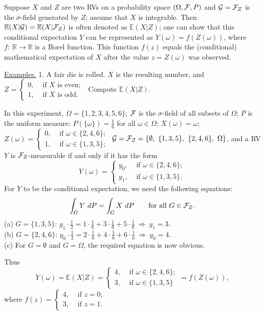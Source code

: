 \documentclass[a4paper,10pt]{article}
\def\RR{\mathbb{R}}
\def\EE{\mathbb{E}}
\newcommand{\1}[1]{\mathbf{1}_{\{#1\}}}
\begin{document}
Suppose $X$ and $Z$ are two RVs on a probability space $(\Omega,{\cal F},P)$ and ${\cal G}={\cal F}_Z$ is the $\sigma$-field generated by $Z$; assume that $X$ is integrable. Then $\EE(X|{\cal G})=\EE(X|{\cal F}_Z)$ is often denoted as $\EE(X|Z)$; one can show that this conditional expectation $Y$ can be represented as $Y(\omega)=f(Z(\omega))$, where $f:~\RR\to\RR$ is a Borel function. This function $f(z)$ equals the (conditional) mathematical expectation of $X$ after the value $z=Z(\omega)$ was observed.\vspace{3mm}

\underline{Examples.} 1. A fair die is rolled. $X$ is the resulting number, and $Z=\left\{\begin{array}{ll} 0, & \mbox{ if } X \mbox{ is even; } \\ 1, & \mbox{ if } X \mbox{ is odd.} \end{array}\right. $ Compute $\EE(X|Z)$.

In this experiment, $\Omega=\{1,2,3,4,5,6\}$; ${\cal F}$ is the $\sigma$-field of all subsets of $\Omega$; $P$ is the uniform measure: $P(\{\omega\})=\frac{1}{6}$ for all $\omega\in\Omega$; $X(\omega)=\omega$; $Z(\omega)=\left\{\begin{array}{ll} 0, & \mbox{ if } \omega\in\{2,4,6\}; \\ 1, & \mbox{ if } \omega\in\{1,3,5\}; \end{array}\right. $ ${\cal G}={\cal F}_Z=\{\emptyset,~ \{1,3,5\},~\{2,4,6\},~\Omega\}$, and a RV $Y$ is ${\cal F}_Z$-measurable if and only if it has the form
  $$Y(\omega)=\left\{\begin{array}{ll} y_0, & \mbox{ if } \omega\in\{2,4,6\}; \\ y_1, & \mbox{ if } \omega\in\{1,3,5\}. \end{array}\right. $$
For $Y$ to be the conditional expectation, we need the following equations:
  $$\int_G Y~dP=\int_G X~dP~~~~~\mbox{ for all } G\in{\cal F}_Z.$$
(a) $G=\{1,3,5\}$: $y_1\cdot\frac{1}{2}=1\cdot\frac{1}{6}+3\cdot\frac{1}{6}+5\cdot\frac{1}{6}~ \Longrightarrow ~ y_1=3.$\\
(b) $G=\{2,4,6\}$: $y_0\cdot\frac{1}{2}=2\cdot\frac{1}{6}+4\cdot\frac{1}{6}+6\cdot\frac{1}{6}~ \Longrightarrow ~ y_0=4.$\\
(c) For $G=\emptyset$ and $G=\Omega$, the required equation is now obvious.

Thus
  $$Y(\omega)=\EE(X|Z)=\left\{\begin{array}{ll} 4, & \mbox{ if } \omega\in\{2,4,6\}; \\ 3, & \mbox{ if } \omega\in\{1,3,5\} \end{array}\right. =f(Z(\omega)),$$
where $f(z)=\left\{\begin{array}{ll} 4, & \mbox{ if } z=0; \\ 3, & \mbox{ if } z=1. \end{array}\right. $ \vspace{3mm}
\end{document}
